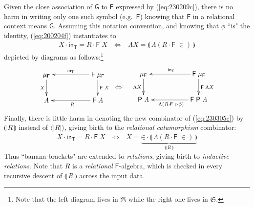 \documentclass{elsarticle}
\newcommand{\Conid}[1]{\mathit{#1}}
\def\myxym#1{\vcenter{\xymatrix{#1}}}
\def\comp{ \mathbin{\cdot} }
\def\fun#1{\mathsf{#1}}
\def\muF{\mu_{\fun F}}
\def\cat#1{{\mathfrak #1}}
\def\muF{\mu_{\fun F}}
\def\quanta#1{\mathopen{\langle\!|}#1\mathclose{|\!\rangle}}
\begin{document}
Given the close association of \ensuremath{\fun G } to \ensuremath{\fun F } expressed by (\ref{eq:230209c}), there is no harm
in writing only one such symbol (e.g.\ \ensuremath{\fun F }) knowing that \ensuremath{\fun F } in a relational context means
\ensuremath{\fun G }. Assuming this notation convention, and knowing that \ensuremath{\phi } ``is" the identity, 
(\ref{eq:200204f}) instantiates to 
\begin{eqnarray}
	\ensuremath{\Conid{X} \comp \mathsf{in}_{\fun T}\mathrel{=}\Conid{R} \comp \fun F \;\Conid{X}} & \ensuremath{~\Leftrightarrow~} & \ensuremath{\Lambda{\Conid{X}}\mathrel{=}\llparenthesis\,\Lambda{(\Conid{R} \comp \fun F \;\mathbin\in )}\,\rrparenthesis}
\end{eqnarray}
depicted by diagrams as follows:\footnote{Note that the left diagram lives in \ensuremath{\cat{R}} while the
right one lives in \ensuremath{\cat{S}}.}
\begin{eqnarray*}
\myxym{
	\ensuremath{\muF }
		\ar[d]_{\ensuremath{\Conid{X}}}
&
&
	\ensuremath{\fun F \;\muF }
		\ar[ll]_-{\ensuremath{\mathsf{in}_{\fun T}}}
		\ar[d]^{\ensuremath{\fun F \;\Conid{X}}}
\\
	\ensuremath{\Conid{A}}
&
&
	\ensuremath{\fun F \;\Conid{A}}
		\ar[ll]^{\ensuremath{\Conid{R}}}
}
&\ensuremath{~\Leftrightarrow~}& 
\myxym{
	\ensuremath{\muF }
		\ar[d]_{\ensuremath{\Lambda{\Conid{X}}}}
&
&
	\ensuremath{\fun F \;\muF }
		\ar[ll]_{\ensuremath{\mathsf{in}_{\fun T}}}
		\ar[d]^{\ensuremath{\fun F \;\Lambda{\Conid{X}}}}
\\
	\ensuremath{\fun P \;\Conid{A}}
&
&
	\ensuremath{\fun F \;\fun P \;\Conid{A}}
		\ar[ll]^{\ensuremath{\Lambda{(\Conid{R} \comp \fun F \;\epsilon  \comp \phi )}}}
}
\end{eqnarray*}
Finally, there is little harm in denoting the new combinator of (\ref{eq:230305c}) by
\ensuremath{\llparenthesis\,\Conid{R}\,\rrparenthesis} instead of \ensuremath{\quanta{\Conid{R}}}, giving birth to the \emph{relational catamorphism} 
combinator:
\begin{eqnarray}
	\ensuremath{\Conid{X} \comp \mathsf{in}_{\fun T}\mathrel{=}\Conid{R} \comp \fun F \;\Conid{X}} & \ensuremath{~\Leftrightarrow~} & \ensuremath{\Conid{X}\mathrel{=}\underbrace{\mathbin\in  \comp \llparenthesis\,\Lambda{(\Conid{R} \comp \fun F \;\mathbin\in )}\,\rrparenthesis}_{\llparenthesis\,\Conid{R}\,\rrparenthesis}}
	\label{eq:210108d}
\end{eqnarray}
Thus ``banana-brackets" are extended to \emph{relations}, giving birth to \emph{inductive relations}. Note that \ensuremath{\Conid{R}} is a \emph{relational} \ensuremath{\fun F }-algebra, which is checked in every recursive descent of \ensuremath{\llparenthesis\,\Conid{R}\,\rrparenthesis}
across the input data.
\end{document}
